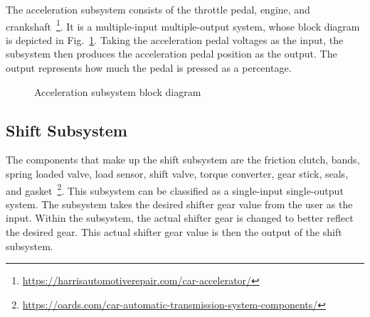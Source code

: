\documentclass[conference]{IEEEtran}
\begin{document}
  The acceleration subsystem consists of the throttle pedal, engine, and crankshaft~\footnote{\url{https://harrisautomotiverepair.com/car-accelerator/}}. It is a multiple-input multiple-output system, whose block diagram is depicted in Fig.~\ref{fig:accelModelArchitecture}.
Taking the acceleration pedal voltages as the input, the subsystem then produces the acceleration pedal position as the output. The output represents how much the pedal is pressed as a percentage. %
%
 \begin{figure}[htbp]
    \centering
    \caption{Acceleration subsystem block diagram}
    \label{fig:accelModelArchitecture}
 \end{figure}
  \subsection{Shift Subsystem}
  The components that make up the shift subsystem are the friction clutch, bands, spring loaded valve, load sensor, shift valve, torque converter, gear stick, seals, and gasket~\footnote{\url{https://oards.com/car-automatic-transmission-system-components/}}. This subsystem can be classified as a single-input single-output system. %
%
  The subsystem takes the desired shifter gear value from the user as the input. Within the subsystem, the actual shifter gear is changed to better reflect the desired gear. This actual shifter gear value is then the output of the shift subsystem.
\end{document}
